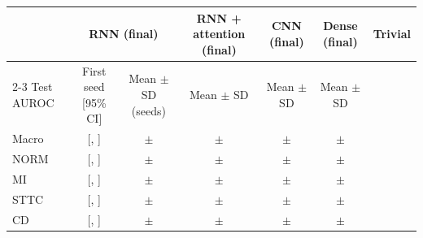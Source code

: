 \begin{tabular}{lcccccc}
\toprule
 & \multicolumn{2}{c}{RNN (final)} & RNN + attention (final) & CNN (final) & Dense (final) & Trivial \\
\cmidrule(lr){2-3}
Test AUROC & First seed [95\% CI] & Mean $\pm$ SD (seeds) & Mean $\pm$ SD & Mean $\pm$ SD & Mean $\pm$ SD &  \\
\midrule
Macro & \rnnFinalFirstTestMacroAuroc{} [\rnnFinalFirstTestMacroAurocLo{}, \rnnFinalFirstTestMacroAurocHi{}] & \rnnFinalTestMacroAurocMean{} $\pm$ \rnnFinalTestMacroAurocSd{} & \rnnAttnfinalTestMacroAurocMean{} $\pm$ \rnnAttnfinalTestMacroAurocSd{} & \cnnFinalTestMacroAurocMean{} $\pm$ \cnnFinalTestMacroAurocSd{} & \denseFinalTestMacroAurocMean{} $\pm$ \denseFinalTestMacroAurocSd{} & \trivialTestMacroAuroc{} \\
\midrule
NORM & \rnnFinalFirstTestAurocNORM{} [\rnnFinalFirstTestAurocNORMLo{}, \rnnFinalFirstTestAurocNORMHi{}] & \rnnFinalTestAurocNORMMean{} $\pm$ \rnnFinalTestAurocNORMSd{} & \rnnAttnfinalTestAurocNORMMean{} $\pm$ \rnnAttnfinalTestAurocNORMSd{} & \cnnFinalTestAurocNORMMean{} $\pm$ \cnnFinalTestAurocNORMSd{} & \denseFinalTestAurocNORMMean{} $\pm$ \denseFinalTestAurocNORMSd{} & \trivialTestAurocNORM{} \\
MI & \rnnFinalFirstTestAurocMI{} [\rnnFinalFirstTestAurocMILo{}, \rnnFinalFirstTestAurocMIHi{}] & \rnnFinalTestAurocMIMean{} $\pm$ \rnnFinalTestAurocMISd{} & \rnnAttnfinalTestAurocMIMean{} $\pm$ \rnnAttnfinalTestAurocMISd{} & \cnnFinalTestAurocMIMean{} $\pm$ \cnnFinalTestAurocMISd{} & \denseFinalTestAurocMIMean{} $\pm$ \denseFinalTestAurocMISd{} & \trivialTestAurocMI{} \\
STTC & \rnnFinalFirstTestAurocSTTC{} [\rnnFinalFirstTestAurocSTTCLo{}, \rnnFinalFirstTestAurocSTTCHi{}] & \rnnFinalTestAurocSTTCMean{} $\pm$ \rnnFinalTestAurocSTTCSd{} & \rnnAttnfinalTestAurocSTTCMean{} $\pm$ \rnnAttnfinalTestAurocSTTCSd{} & \cnnFinalTestAurocSTTCMean{} $\pm$ \cnnFinalTestAurocSTTCSd{} & \denseFinalTestAurocSTTCMean{} $\pm$ \denseFinalTestAurocSTTCSd{} & \trivialTestAurocSTTC{} \\
CD & \rnnFinalFirstTestAurocCD{} [\rnnFinalFirstTestAurocCDLo{}, \rnnFinalFirstTestAurocCDHi{}] & \rnnFinalTestAurocCDMean{} $\pm$ \rnnFinalTestAurocCDSd{} & \rnnAttnfinalTestAurocCDMean{} $\pm$ \rnnAttnfinalTestAurocCDSd{} & \cnnFinalTestAurocCDMean{} $\pm$ \cnnFinalTestAurocCDSd{} & \denseFinalTestAurocCDMean{} $\pm$ \denseFinalTestAurocCDSd{} & \trivialTestAurocCD{} \\

\end{tabular}

